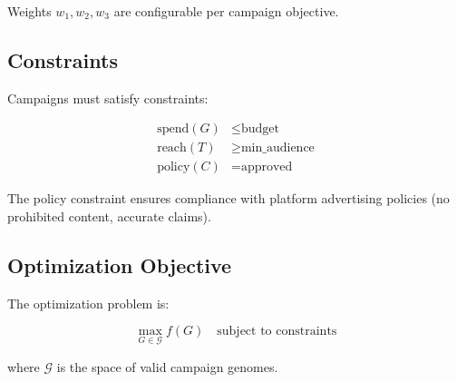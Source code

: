 Weights $w_1, w_2, w_3$ are configurable per campaign objective.

\subsection{Constraints}

Campaigns must satisfy constraints:

\begin{align}
\text{spend}(G) &\leq \text{budget} \\
\text{reach}(T) &\geq \text{min\_audience} \\
\text{policy}(C) &= \text{approved}
\end{align}

The policy constraint ensures compliance with platform advertising policies (no prohibited content, accurate claims).

\subsection{Optimization Objective}

The optimization problem is:

\begin{equation}
\max_{G \in \mathcal{G}} f(G) \quad \text{subject to constraints}
\end{equation}

where $\mathcal{G}$ is the space of valid campaign genomes.

